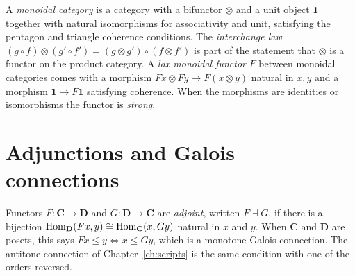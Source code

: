 A \emph{monoidal category} is a category with a bifunctor $\otimes$ and a unit object $\mathbf{1}$ together with natural isomorphisms for associativity and unit, satisfying the pentagon and triangle coherence conditions. The \emph{interchange law} $(g\circ f)\otimes(g'\circ f')=(g\otimes g')\circ(f\otimes f')$ is part of the statement that $\otimes$ is a functor on the product category. A \emph{lax monoidal functor} $F$ between monoidal categories comes with a morphism $Fx\otimes Fy\to F(x\otimes y)$ natural in $x,y$ and a morphism $\mathbf{1}\to F\mathbf{1}$ satisfying coherence. When the morphisms are identities or isomorphisms the functor is \emph{strong}.

\section*{Adjunctions and Galois connections}

Functors $F:\mathbf{C}\to\mathbf{D}$ and $G:\mathbf{D}\to\mathbf{C}$ are \emph{adjoint}, written $F\dashv G$, if there is a bijection $\operatorname{Hom}_{\mathbf{D}}(Fx,y)\cong\operatorname{Hom}_{\mathbf{C}}(x,Gy)$ natural in $x$ and $y$. When $\mathbf{C}$ and $\mathbf{D}$ are posets, this says $Fx\le y\iff x\le Gy$, which is a monotone Galois connection. The antitone connection of Chapter~\ref{ch:scripts} is the same condition with one of the orders reversed.
